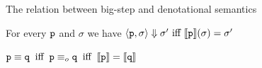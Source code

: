 \documentclass{beamer}
\begin{document}
\begin{frame}{The relation between big-step and denotational semantics}

        \vfill
        \begin{theorem}
                For every $\mathtt{p}$ and $\sigma$ we
                have 
                $\langle \mathtt{p}, \sigma \rangle \Downarrow \sigma' \text{ iff }
                \llbracket \mathtt{p} \rrbracket(\sigma) = \sigma'$
        \end{theorem}

        \bigskip
        \bigskip
        \begin{corollary}
                $\mathtt{p} \equiv \mathtt{q} \> \text{ iff } \>
                \mathtt{p} \equiv_o \mathtt{q} \> \text{ iff } \>
                \llbracket \mathtt{p} \rrbracket = \llbracket \mathtt{q} \rrbracket$
        \end{corollary}
\end{frame}



\end{document}
